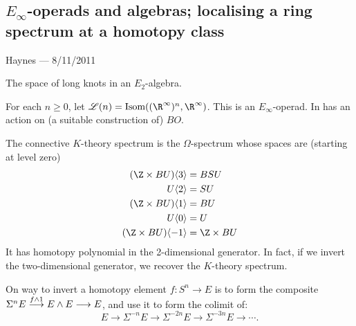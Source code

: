 \documentclass[11pt]{article}
\newcommand{\CONVERSATION}[3]{
\subsection*{#1}
\begin{flushright}
{\small #2 --- #3}
\end{flushright}
}
\begin{document}
\CONVERSATION{$E_{\infty}$-operads and algebras; localising a ring spectrum at a homotopy class}{Haynes}{8/11/2011}
The space of long knots in an $E_2$-algebra.

For each $n\geq0$, let $\scrL(n)=\textup{Isom}((\R^\infty)^n,\R^\infty)$. This is an $E_\infty$-operad. In has an action on (a suitable construction of) $BO$.

The connective $K$-theory spectrum is the $\Omega$-spectrum whose spaces are (starting at level zero)
\begin{alignat*}{2}
(\Z\times BU)\langle 3\rangle&=BSU%
\\U\langle 2\rangle&=SU%
\\(\Z\times BU)\langle 1\rangle&=BU%
\\U\langle 0\rangle&=U%
\\(\Z\times BU)\langle -1\rangle&=\Z\times BU%
\end{alignat*}
It has homotopy polynomial in the 2-dimensional generator. In fact, if we invert the two-dimensional generator, we recover the $K$-theory spectrum.

On way to invert a homotopy element $f:S^n\to E$ is to form the composite $\Sigma^nE\overset{f\wedge1}{\longrightarrow}E\wedge E\longrightarrow E$, and use it to form the colimit of:
\[E\to\Sigma^{-n}E\to\Sigma^{-2n}E\to\Sigma^{-3n}E\to\cdots.\]
\end{document}
